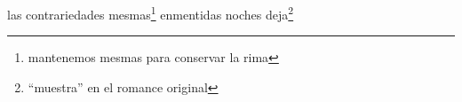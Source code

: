 las contrariedades mesmas\footnote{\textsuperscript{}mantenemos mesmas para conservar la rima}
enmentidas noches deja\footnote{\textsuperscript{}``muestra'' en el romance original}
